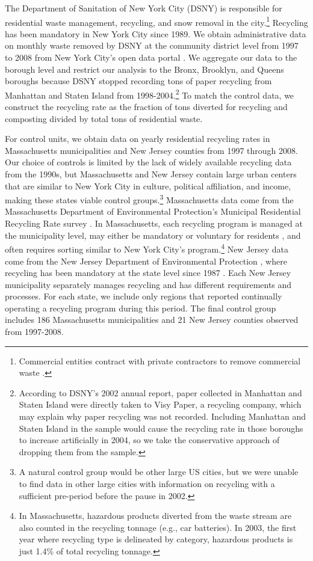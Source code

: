 \documentclass[12pt]{article}
\begin{document}
The Department of Sanitation of New York City (DSNY) is responsible for residential waste management, recycling, and snow removal in the city.\footnote{Commercial entities contract with private contractors to remove commercial waste \citep{dsnycommercial}.}  Recycling has been mandatory in New York City since 1989.  We obtain administrative data on monthly waste removed by DSNY at the community district level from 1997 to 2008 from New York City's open data portal \citep{dsnydata}. We aggregate our data to the borough level and restrict our analysis to the Bronx, Brooklyn, and Queens boroughs because DSNY stopped recording tons of paper recycling from Manhattan and Staten Island from 1998-2004.\footnote{According to DSNY's 2002 annual report, paper collected in Manhattan and Staten Island were directly taken to Visy Paper, a recycling company, which may explain why paper recycling was not recorded.  Including Manhattan and Staten Island in the sample would cause the recycling rate in those boroughs to increase artificially in 2004, so we take the conservative approach of dropping them from the sample.}  To match the control data, we construct the recycling rate as the fraction of tons diverted for recycling and composting divided by total tons of residential waste.

For control units, we obtain data on yearly residential recycling rates in Massachusetts municipalities and New Jersey counties from 1997 through 2008.  Our choice of controls is limited by the lack of widely available recycling data from the 1990s, but Massachusetts and New Jersey contain large urban centers that are similar to New York City in culture, political affiliation, and income, making these states viable control groups.\footnote{A natural control group would be other large US cities, but we were unable to find data in other large cities with information on recycling with a sufficient pre-period before the pause in 2002.} Massachusetts data come from the Massachusetts Department of Environmental Protection's Municipal Residential Recycling Rate survey \citep{massdata}.  In Massachusetts, each recycling program is managed at the municipality level, may either be mandatory or voluntary for residents \citep{massmandatory2021}, and often requires sorting similar to New York City's program.\footnote{In Massachusetts, hazardous products diverted from the waste stream are also counted in the recycling tonnage (e.g., car batteries). In 2003, the first year where recycling type is delineated by category, hazardous products is just 1.4\% of total recycling tonnage.}  New Jersey data come from the New Jersey Department of Environmental Protection \citep{njdata}, where recycling has been mandatory at the state level since 1987 \citep{njlaw}. Each New Jersey municipality separately manages recycling and has different requirements and processes.  For each state, we include only regions that reported continually operating a recycling program during this period.  The final control group includes 186 Massachusetts municipalities and 21 New Jersey counties observed from 1997-2008.
\end{document}
